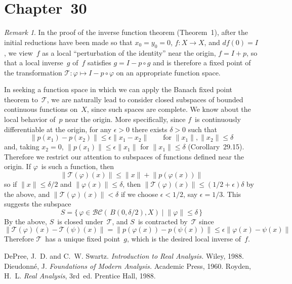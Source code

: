 \documentclass[letterpaper,12pt]{article}
\newcommand{\BC}{\mathcal{BC}}
\newcommand{\T}{\mathcal{T}}
\newcommand{\after}{\circ}
\newcommand{\df}{d\!f}
\newcommand{\norm}[1]{\lVert{#1}\rVert}
\theoremstyle{plain}
\theoremstyle{definition}
\theoremstyle{remark}
\newtheorem*{rmk}{Remark}
\begin{document}
\section*{Chapter~30}
\begin{rmk}
In the proof of the inverse function theorem (Theorem~1), after the initial reductions have been made so that \(x_0=y_0=0\), \(f:X\to X\), and \(\df(0)=I\), we view~\(f\) as a local ``perturbation of the identity'' near the origin, \(f=I+p\), so that a local inverse~\(g\) of~\(f\) satisfies \(g=I-p\after g\) and is therefore a fixed point of the transformation \(\T:\varphi\mapsto I-p\after\varphi\) on an appropriate function space.

In seeking a function space in which we can apply the Banach fixed point theorem to~\(\T\), we are naturally lead to consider closed subspaces of bounded continuous functions on~\(X\), since such spaces are complete. We know about the local behavior of~\(p\) near the origin. More specifically, since \(f\)~is continuously differentiable at the origin, for any \(\epsilon>0\) there exists \(\delta>0\) such that
\[\norm{p(x_1)-p(x_2)}\le\epsilon\norm{x_1-x_2}\qquad\text{for }\norm{x_1},\norm{x_2}\le\delta\]
and, taking \(x_2=0\), \(\norm{p(x_1)}\le\epsilon\norm{x_1}\) for \(\norm{x_1}\le\delta\) (Corollary~29.15). Therefore we restrict our attention to subspaces of functions defined near the origin. If \(\varphi\)~is such a function, then
\[\norm{\T(\varphi)(x)}\le\norm{x}+\norm{p(\varphi(x))}\]
so if \(\norm{x}\le\delta/2\) and \(\norm{\varphi(x)}\le\delta\), then \(\norm{\T(\varphi)(x)}\le(1/2+\epsilon)\delta\) by the above, and \(\norm{\T(\varphi)(x)}<\delta\) if we choose \(\epsilon<1/2\), say \(\epsilon=1/3\). This suggests the subspace
\[S=\{\,\varphi\in\BC(\,B(0,\delta/2),X)\mid\norm{\varphi}\le\delta\,\}\]
By the above, \(S\)~is closed under~\(\T\), and \(S\)~is contracted by~\(\T\) since
\[\norm{\T(\varphi)(x)-\T(\psi)(x)}=\norm{p(\varphi(x))-p(\psi(x))}\le\epsilon\norm{\varphi(x)-\psi(x)}\]
Therefore \(\T\)~has a unique fixed point~\(g\), which is the desired local inverse of~\(f\).
\end{rmk}

\begin{thebibliography}{0}
 DePree, J.~D. and C.~W. Swartz. \textit{Introduction to Real Analysis.} Wiley, 1988.
 Dieudonn\'e, J. \textit{Foundations of Modern Analysis.} Academic Press, 1960.
 Royden, H.~L. \textit{Real Analysis}, 3rd~ed. Prentice Hall, 1988.
\end{thebibliography}
\end{document}
